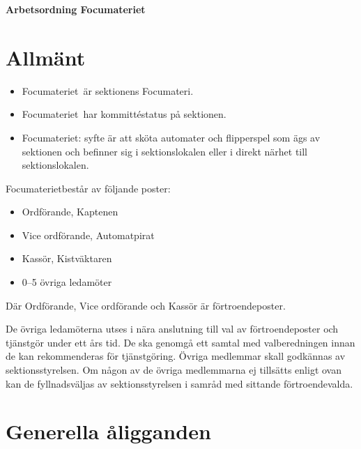 

\renewcommand{\dateseparator}{-} %

\renewcommand{\forening}{Focumateriet}

\begin{center}
\LARGE{\textbf{Arbetsordning \forening}}
\end{center}



\section{Allmänt}
\begin{itemize}

\item \forening \  är sektionens Focumateri.
\item \forening \ har kommittéstatus på sektionen.
\item \forening: syfte är att sköta automater och flipperspel som ägs av sektionen och befinner sig i sektionslokalen eller i direkt närhet till sektionslokalen.
\end{itemize}

\forening består av följande poster:
\begin{itemize}
\item Ordförande, Kaptenen
\item Vice ordförande, Automatpirat
\item Kassör, Kistväktaren
\item 0--5 övriga ledamöter
\end{itemize}

Där Ordförande, Vice ordförande och Kassör är förtroendeposter. 

De övriga ledamöterna utses i nära anslutning till val av förtroendeposter och tjänstgör
under ett års tid. De ska genomgå ett samtal med valberedningen innan de kan rekommenderas för tjänstgöring. Övriga medlemmar skall
godkännas av sektionsstyrelsen. Om någon av de övriga
medlemmarna ej tillsätts enligt ovan kan de fyllnadsväljas av sektionsstyrelsen
i samråd med sittande förtroendevalda.

\section{Generella åligganden}

